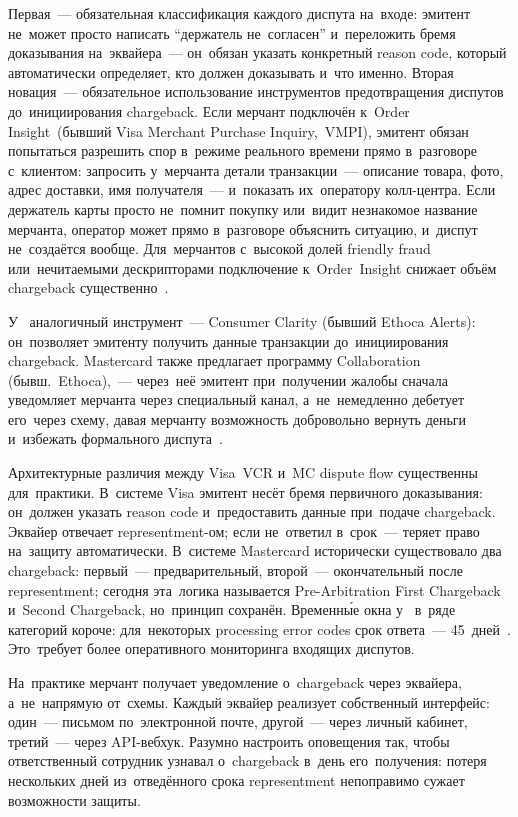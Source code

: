 Первая~--- обязательная классификация каждого диспута на~входе: эмитент
не~может просто написать \enquote{держатель не~согласен} и~переложить
бремя доказывания на~эквайера~--- он~обязан указать конкретный reason code,
который автоматически определяет, кто должен доказывать и~что именно.
Вторая новация~--- обязательное использование инструментов предотвращения
диспутов до~инициирования chargeback. Если мерчант подключён к~Order
Insight~(бывший Visa Merchant Purchase Inquiry,~VMPI), эмитент обязан
попытаться разрешить спор в~режиме реального времени прямо в~разговоре
с~клиентом: запросить у~мерчанта детали транзакции~--- описание товара,
фото, адрес доставки, имя получателя~--- и~показать их~оператору колл-центра.
Если держатель карты просто не~помнит покупку или~видит незнакомое
название мерчанта, оператор может прямо в~разговоре объяснить ситуацию,
и~диспут не~создаётся вообще. Для~мерчантов с~высокой долей friendly fraud
или~нечитаемыми дескрипторами подключение к~Order~Insight снижает объём
chargeback существенно~.

У~ аналогичный инструмент~--- Consumer Clarity
(бывший Ethoca Alerts): он~позволяет эмитенту получить данные транзакции
до~инициирования chargeback. Mastercard также предлагает программу Collaboration
(бывш.\ Ethoca),~--- через~неё эмитент при~получении жалобы сначала
уведомляет мерчанта через специальный канал, а~не~немедленно дебетует
его~через схему, давая мерчанту возможность добровольно вернуть деньги
и~избежать формального диспута~.

Архитектурные различия между Visa~VCR и~MC dispute flow
существенны для~практики. В~системе Visa эмитент несёт бремя первичного
доказывания: он~должен указать reason code и~предоставить данные при~подаче
chargeback. Эквайер отвечает representment-ом; если не~ответил в~срок~---
теряет право на~защиту автоматически. В~системе Mastercard исторически
существовало два chargeback: первый~--- предварительный, второй~--- окончательный
после representment; сегодня эта~логика называется Pre-Arbitration First
Chargeback и~Second Chargeback, но~принцип сохранён. Временны́е окна
у~ в~ряде категорий короче: для~некоторых processing
error codes срок ответа~--- 45~дней~. Это~требует
более оперативного мониторинга входящих диспутов.

\begin{practice}
  На~практике мерчант получает уведомление о~chargeback через эквайера,
  а~не~напрямую от~схемы. Каждый эквайер реализует собственный интерфейс:
  один~--- письмом по~электронной почте, другой~--- через личный кабинет,
  третий~--- через API-вебхук. Разумно настроить оповещения так, чтобы
  ответственный сотрудник узнавал о~chargeback в~день его~получения:
  потеря нескольких дней из~отведённого срока representment непоправимо
  сужает возможности защиты.
\end{practice}


